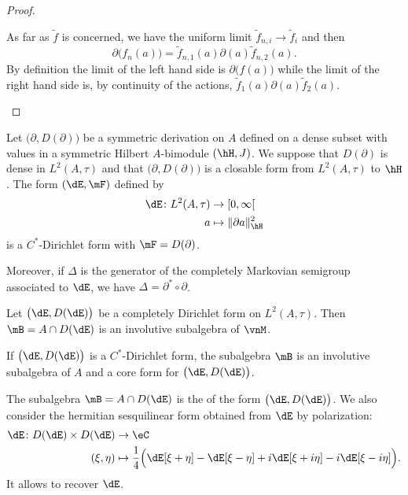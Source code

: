 \begin{proof}
\begin{enumerate}
            As far as \( \tilde f\) is concerned, we have the uniform limit \( \tilde f_{n,i}\to\tilde f_i\) and then
            \begin{equation}
                \partial\big( f_n(a) \big)=\tilde f_{n,1}(a)\partial(a)\tilde f_{n,2}(a).
            \end{equation}
            By definition the limit of the left hand side is \( \partial\big( f(a) \big)\) while the limit of the right hand side is, by continuity of the actions, \( \tilde f_1(a)\partial(a)\tilde f_2(a)\).
            
    \end{enumerate}
    
\end{proof}

\begin{theorem}
	Let $\big( \partial,D(\partial) \big)$ be a symmetric derivation on $A$ defined on a dense subset with values in a symmetric Hilbert $A$-bimodule $(\hH,J)$. We suppose that $D(\partial)$ is dense in $L^2(A,\tau)$ and that $\big( \partial,D(\partial) \big)$ is a closable form from $L^2(A,\tau)$ to $\hH$. The form $(\dE,\mF)$ defined by
	\begin{equation}
		\begin{aligned}
			\dE\colon L^2(A,\tau)&\to \mathopen[ 0 , \infty [ \\
			a&\mapsto \| \partial a \|^2_{\hH} 
		\end{aligned}
	\end{equation}
	is  a $C^*$-Dirichlet form with $\mF=D(\partial)$.

	Moreover, if $\Delta$ is the generator of the completely Markovian semigroup associated to $\dE$, we have $\Delta=\partial^*\circ \partial$.
\end{theorem}

\begin{proposition}
	Let $\big( \dE,D(\dE) \big)$ be a completely Dirichlet form on $L^2(A,\tau)$. Then $\mB=A\cap D(\dE)$ is an involutive subalgebra of $\vnM$.

	If $\big( \dE,D(\dE) \big)$ is a $C^*$-Dirichlet form, the subalgebra $\mB$ is an involutive subalgebra of $A$ and a core form for $\big( \dE,D(\dE) \big)$.
\end{proposition}

The subalgebra $\mB=A\cap D(\dE)$ is the  of the form $\big( \dE,D(\dE) \big)$. We also consider the hermitian sesquilinear form obtained from \(\dE\) by polarization:
\begin{equation}
    \begin{aligned}
        \dE\colon D(\dE)\times D(\dE)&\to \eC \\
        (\xi,\eta)&\mapsto \frac{1}{ 4 }\Big( \dE[\xi+\eta]-\dE[\xi-\eta]+i\dE[\xi+i\eta]-i\dE[\xi-i\eta]  \Big).
    \end{aligned}
\end{equation}
It allows to recover \(\dE\).

